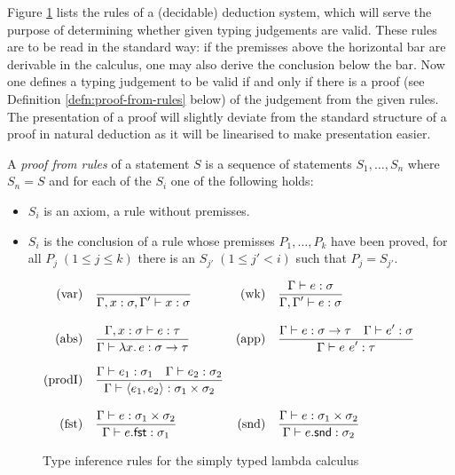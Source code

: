 Figure \ref{fig:rules-typed-lambda} lists the rules of a (decidable) deduction
system, which will serve the purpose of determining whether given typing
judgements are valid. These rules are to be read in the standard way: if the
premisses above the horizontal bar are derivable in the calculus, one may also
derive the conclusion below the bar. Now one defines a typing judgement to be
valid if and only if there is a proof (see Definition
\ref{defn:proof-from-rules} below) of the judgement from the given rules. The
presentation of a proof will slightly deviate from the standard structure of a
proof in natural deduction as it will be linearised to make presentation easier.

\begin{defn}
\label{defn:proof-from-rules}
A \emph{proof from rules} of a statement $S$ is a sequence of statements
$S_1,\ldots,S_n$ where $S_n = S$ and for each of the $S_i$ one of the following
holds:
\begin{itemize}
\item $S_i$ is an axiom, \IE a rule without premisses.
\item $S_i$ is the conclusion of a rule whose premisses $P_1,\ldots,P_k$ 
  have been proved, \IE for all $P_j \;(1\leq j\leq k)$ there is an $S_{j'} \;(1\leq j'<i)$
  such that $P_j = S_{j'}$.
\end{itemize}
\end{defn}


\begin{figure}
  \begin{align*}
    \mathrm{(var)}\quad& \frac{\displaystyle }{\displaystyle \Gamma, x:\sigma, \Gamma' \vdash x:\sigma} &
    \mathrm{(wk)} \quad& \frac{\displaystyle \Gamma \vdash e : \sigma}{\displaystyle \Gamma,\Gamma' \vdash e : \sigma}\\[2ex]
    \mathrm{(abs)}\quad & \frac{\displaystyle \Gamma, x:\sigma \vdash e:\tau}{\displaystyle \Gamma \vdash {\lambda x.\,e} : \sigma\to\tau} &
    \mathrm{(app)}\quad & \frac{\displaystyle \Gamma \vdash e : \sigma\to\tau \quad \Gamma \vdash e' : \sigma}{\displaystyle \Gamma \vdash e\ e' : \tau}\\[2ex]
    \mathrm{(prodI)}\quad & \frac{\displaystyle \Gamma \vdash e_1:\sigma_1 \quad \Gamma \vdash e_2:\sigma_2}{\displaystyle \Gamma \vdash \langle e_1,e_2\rangle : \sigma_1 \times \sigma_2}\\[2ex]
    \mathrm{(fst)} \quad & \frac{\displaystyle \Gamma \vdash e : \sigma_1 \times \sigma_2}{\displaystyle \Gamma \vdash e.\mathsf{fst} : \sigma_1} &
    \mathrm{(snd)} \quad & \frac{\displaystyle \Gamma \vdash e : \sigma_1 \times \sigma_2}{\displaystyle \Gamma \vdash e.\mathsf{snd} : \sigma_2} &
  \end{align*}
  \caption{Type inference rules for the simply typed lambda calculus}
  \label{fig:rules-typed-lambda}
\end{figure}

